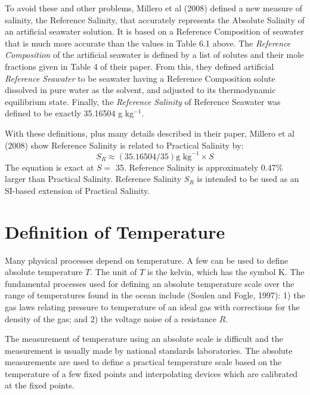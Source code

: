 To avoid these and other problems, Millero et al (2008) defined a new
measure of salinity, the Reference Salinity, that accurately
represents the Absolute Salinity of an artificial seawater
solution. It is based on a Reference Composition of seawater that is
much more accurate than the values in Table 6.1 above. The
\textit{Reference Composition} of the
artificial seawater is defined by a list of solutes and their mole
fractions given in Table 4 of their paper. From this, they defined
artificial \textit{Reference Seawater} to be seawater having a Reference Composition
solute dissolved in pure water as the solvent, and adjusted to its
thermodynamic equilibrium state. Finally, the \textit{Reference
  Salinity} of Reference Seawater was defined to be exactly 35.16504 g
kg$^{-1}$.

With these definitions, plus many details described in their paper,
Millero et al (2008) show Reference Salinity is related to Practical
Salinity by:
\begin{equation}
S_R \approx (35.16504/35) \text{g kg}^{-1} \times S
\end{equation}
The equation is exact at $S = $ 35. Reference Salinity is
approximately 0.47\% larger than Practical Salinity. Reference
Salinity $S_R$ is intended to be used as an SI-based extension of
Practical Salinity.

\section{Definition of Temperature}
Many physical processes depend on
temperature. A few can be used to define absolute
temperature $T$. The unit of $T$ is the kelvin, which has the symbol
K. The fundamental processes used for defining an absolute temperature
scale over the range of temperatures found in the ocean include
(Soulen and Fogle, 1997): 1) the gas laws relating pressure to
temperature of an ideal gas with corrections for the density of the
gas; and 2) the voltage noise of a resistance $R$.

The measurement of temperature using an absolute
scale is difficult and the measurement is
usually made by national standards laboratories. The absolute
measurements are used to define a practical temperature
scale based on the temperature of a
few fixed points and interpolating devices which are calibrated at the
fixed points.

